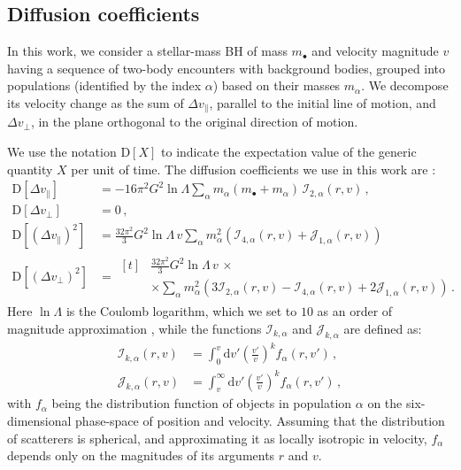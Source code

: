 \documentclass[desactivate]{aa}
\begin{document}
\begin{appendix}

\section{Diffusion coefficients}\label{app:diff_coe}

    In this work, we consider a stellar-mass BH of mass $m_\bullet$ and velocity magnitude $v$ having a sequence of two-body encounters with background bodies, grouped into populations (identified by the index $\alpha$) based on their masses $m_\alpha$. We decompose its velocity change as the sum of $\Delta v_\parallel$, parallel to the initial line of motion, and $\Delta v_\perp$, in the plane orthogonal to the original direction of motion.
    
    We use the notation $\mathrm{D}[X]$ to indicate the expectation value of the generic quantity $X$ per unit of time. The diffusion coefficients we use in this work are \citep{1943ApJ....97..255C,2008gady.book.....B,2013degn.book.....M}:
    \begin{align}
        \mathrm{D}\left[\Delta v_\parallel\right] &= -16\pi^2 G^2 \ln \Lambda \sum_\alpha m_\alpha (m_\bullet+m_\alpha) \, \mathcal{I}_{2,\alpha}(r,v) \, ,\\
        \mathrm{D}\left[\Delta v_\perp\right] &= 0 \, ,\\
        \mathrm{D}\left[\left(\Delta v_\parallel\right)^2\right] &= \frac{32 \pi^2}{3} G^2 \ln\Lambda \, v \sum_\alpha m_\alpha^2 \left( \mathcal{I}_{4,\alpha} (r,v) + \mathcal{J}_{1,\alpha} (r,v) \right) \\
        \mathrm{D}\left[\left(\Delta v_\perp\right)^2\right] &=
        \begin{aligned}[t]
            &\frac{32 \pi^2}{3} G^2 \ln \Lambda \, v \, \times \\
            & \times \sum_\alpha m_\alpha^2 \left( 3\mathcal{I}_{2,\alpha} (r,v) -\mathcal{I}_{4,\alpha} (r,v) + 2\mathcal{J}_{1,\alpha} (r,v) \right) \, .
        \end{aligned}
    \end{align}
    Here $\ln{\Lambda}$ is the Coulomb logarithm, which we set to $10$ as an order of magnitude approximation \citep{2003MNRAS.344...22S,2013CQGra..30x4005M}, while the functions $\mathcal{I}_{k,\alpha}$ and $\mathcal{J}_{k,\alpha}$ are defined as:
    \begin{align}
        \mathcal{I}_{k,\alpha} (r,v) &= \int^v_0 \mathrm{d}v' \left(\frac{v'}{v}\right)^k f_\alpha(r,v') \, , \\
        \mathcal{J}_{k,\alpha} (r,v) &= \int^\infty_v \mathrm{d}v' \left(\frac{v'}{v}\right)^k f_\alpha(r,v') \, ,
    \end{align}
    with $f_\alpha$ being the distribution function of objects in population $\alpha$ on the six-dimensional phase-space of position and velocity. Assuming that the distribution of scatterers is spherical, and approximating it as locally isotropic in velocity, $f_\alpha$ depends only on the magnitudes of its arguments $r$ and $v$.


\end{appendix}
\end{document}
